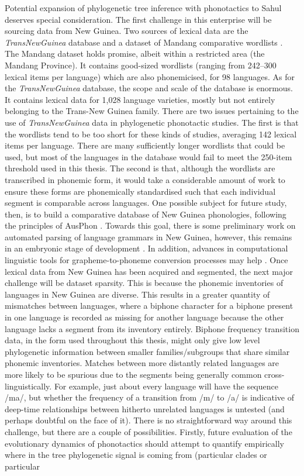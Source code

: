 Potential expansion of phylogenetic tree inference with phonotactics to Sahul deserves special consideration. The first challenge in this enterprise will be sourcing data from New Guinea. Two sources of lexical data are the \emph{TransNewGuinea} database \autocite{greenhill_transnewguinea_2015} and a dataset of Mandang comparative wordlists \autocite{zgraggen_comparative_1980}. The Mandang dataset holds promise, albeit within a restricted area (the Mandang Province). It contains good-sized wordlists (ranging from 242--300 lexical items per language) which are also phonemicised, for 98 languages. As for the \emph{TransNewGuinea} database, the scope and scale of the database is enormous. It contains lexical data for 1,028 language varieties, mostly but not entirely belonging to the Trans-New Guinea family. There are two issues pertaining to the use of \emph{TransNewGuinea} data in phylogenetic phonotactic studies. The first is that the wordlists tend to be too short for these kinds of studies, averaging 142 lexical items per language. There are many sufficiently longer wordlists that could be used, but most of the languages in the database would fail to meet the 250-item threshold used in this thesis. The second is that, although the wordlists are transcribed in phonemic form, it would take a considerable amount of work to ensure these forms are phonemically standardised such that each individual segment is comparable across languages. One possible subject for future study, then, is to build a comparative database of New Guinea phonologies, following the principles of AusPhon \autocite{round_ausphon-lexicon_2017}. Towards this goal, there is some preliminary work on automated parsing of language grammars in New Guinea, however, this remains in an embryonic stage of development \autocite{round_automated_2020}. In addition, advances in computational linguistic tools for grapheme-to-phoneme conversion processes may help \autocite[see][]{salesky_corpus_2020}. Once lexical data from New Guinea has been acquired and segmented, the next major challenge will be dataset sparsity. This is because the phonemic inventories of languages in New Guinea are diverse. This results in a greater quantity of mismatches between languages, where a biphone character for a biphone present in one language is recorded as missing for another language because the other language lacks a segment from its inventory entirely. Biphone frequency transition data, in the form used throughout this thesis, might only give low level phylogenetic information between smaller families/subgroups that share similar phonemic inventories. Matches between more distantly related languages are more likely to be spurious due to the segments being generally common cross-linguistically. For example, just about every language will have the sequence /ma/, but whether the frequency of a transition from /m/ to /a/ is indicative of deep-time relationships between hitherto unrelated languages is untested (and perhaps doubtful on the face of it). There is no straightforward way around this challenge, but there are a couple of possibilities. Firstly, future evaluation of the evolutionary dynamics of phonotactics should attempt to quantify empirically where in the tree phylogenetic signal is coming from (particular clades or particular 